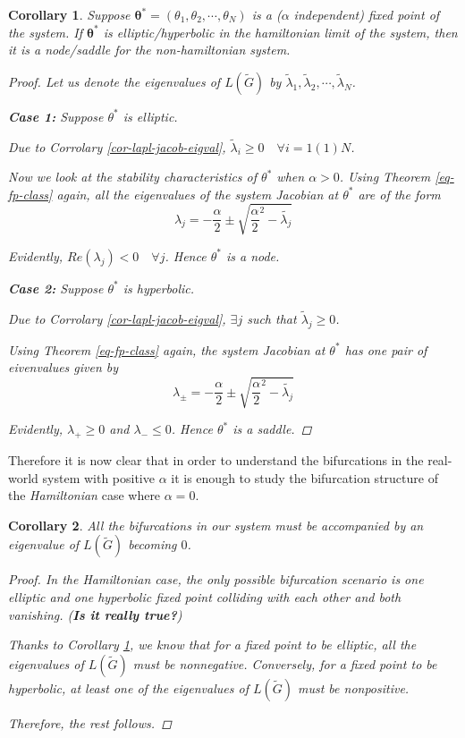 \documentclass[10pt,aps,pra,twocolumn,superscriptaddress]{revtex4-1}
\newtheorem{corr}{Corollary}
\begin{document}
\begin{corr}
\label{corr-hamil-dissip-bif}
Suppose $\mathbf{\theta^*}=(\theta_1,\theta_2,\cdots,\theta_N)$ is a ($\alpha$ independent) fixed point 
of the system.  If $\mathbf{\theta^*}$ is elliptic/hyperbolic in the 
hamiltonian limit of the system, 
then it is a node/saddle for the non-hamiltonian system.  

\begin{proof}
 Let us denote the eigenvalues of $L(\tilde{G})$ by 
$\tilde{\lambda}_1,\tilde{\lambda}_2,\cdots,\tilde{\lambda}_N$. 

\textbf{Case 1:} Suppose $\theta^*$ is elliptic.  

Due to Corrolary \ref{cor-lapl-jacob-eigval}, $\tilde{\lambda}_i\geq 0 \hspace{1em}\forall i=1(1)N$.

Now we look at the stability characteristics of $\theta^*$ when $\alpha>0$.  
Using Theorem \ref{eq-fp-class} again, all 
the eigenvalues of the system Jacobian at $\theta^*$ are of the form
\[
\lambda_j=-\frac{\alpha}{2}\pm \sqrt{\frac{\alpha}{2}^{2}-\tilde{\lambda_j}}
\]

Evidently, $Re(\lambda_j)<0\hspace{1em}\forall j$.  Hence $\theta^*$ is a node.  

\textbf{Case 2:} Suppose $\theta^*$ is hyperbolic.  

 Due to Corrolary \ref{cor-lapl-jacob-eigval}, $\exists j$ such that  
$\tilde{\lambda}_j\geq 0$.

  
Using Theorem \ref{eq-fp-class} again, the system Jacobian at $\theta^*$ has 
one pair of eivenvalues given by
\[
\lambda_{\pm}=-\frac{\alpha}{2}\pm \sqrt{\frac{\alpha}{2}^{2}-\tilde{\lambda_j}}
\]

Evidently, $\lambda_+\geq 0$ and   $\lambda_-\leq 0$. Hence $\theta^*$ is a 
saddle.  
\end{proof}
\end{corr}


Therefore it is now clear that in order to understand the bifurcations in the 
real-world system with positive $\alpha$ it is enough to study the 
bifurcation structure of the \emph{Hamiltonian} case where $\alpha=0$.  

\begin{corr}
\label{corr-eigval-zero}
All the bifurcations in our system must be accompanied by an eigenvalue of 
$L(\tilde{G})$ becoming $0$.  

\begin{proof}
In the Hamiltonian case, the only possible bifurcation scenario is one 
elliptic and one hyperbolic fixed point colliding with each other and both 
vanishing.  (\textbf{Is it really true?})

Thanks to Corollary \ref{corr-hamil-dissip-bif}, we know that for a  fixed 
point to be elliptic, all the eigenvalues of $L(\tilde{G})$ must be 
nonnegative.  Conversely, for a  fixed 
point to be hyperbolic, at least one of the eigenvalues of $L(\tilde{G})$ must be 
nonpositive. 

Therefore, the rest follows.  
\end{proof}
\end{corr}
\end{document}
